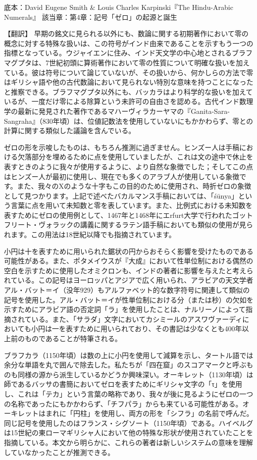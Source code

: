 \documentclass[a4paper,11pt,openany]{ltjsbook}
\begin{document}
底本：David Eugene Smith \& Louis Charles Karpinski『The Hindu-Arabic Numerals』
該当章：第4章：記号「ゼロ」の起源と誕生

【翻訳】
早期の銘文に見られる以外にも、数論に関する初期著作において零の概念に対する特殊な扱いは、この符号がインド由来であることを示すもう一つの指標となっている。ウジャイエンに住み、インド天文学の中心地とされるブラフマグプタは、7世紀初頭に算術著作において零の性質について明確な扱いを加えている。彼は符号について論じていないが、その扱いから、何かしらの方法で零はギリシャ語や他の古代数論において見られない特別な意味を持つことになったと推察できる。ブラフマグプタ以外にも、バッカラはより科学的な扱いを加えているが、一度だけ零による除算という未許可の自由さを認める。古代インド数理学の最新に発見された著作であるマハーヴィラカーヤマの『Ganita-Sara-Sangraha』（830年頃）は、位値記数法を使用していないにもかかわらず、零との計算に関する類似した議論を含んでいる。

ゼロの形を示唆したものは、もちろん推測に過ぎません。ヒンズー人は手稿における欠落部分を埋めるために点を使用していましたが、これは文の途中で休止を表すときのように我々が使用するように、より自然な象徴でした；そしてこの点はヒンズー人が最初に使用し、現在でも多くのアラブ人が使用している象徴です。また、我々のXのような十字もこの目的のために使用され、時折ゼロの象徴として見つかります。上記で述べたバカルマンス手稿においては、「śūnya」という言葉に点を用いて未知数と零を表しています。また、比例式における未知数を表すためにゼロの使用例として、1467年と1468年にエrfurt大学で行われたゴットフリート・ヴォラックの講義に関するラテン語手稿においても類似の使用が見られます。この用法は18世紀以降でも指摘されています。

小円は十を表すために用いられた鋸状の円からおそらく影響を受けたものである可能性がある。また、ポタメイウスが『大成』において性単位制における偶然の空白を示すために使用したオミクロンも、インドの著者に影響を与えたと考えられている。この記号はヨーロッパとアジアで広く用いられ、アラビアの天文学者アル・バット＝イ（没年929）もアルファベット的な数字符号に関連して類似の記号を使用した。アル・バット＝イが性単位制における分（または秒）の欠如を示すためにアラビア語の否定詞「ラ」を使用したことは、ナルリーノによって指摘されている。また、「サラダ」文字においてカシミールのアスワヴァーディにおいても小円は一を表すために用いられており、その書記は少なくとも400年以上前のものであることが特筆される。

ブラフカラ（1150年頃）は数の上に小円を使用して減算を示し、タートル語では余分な単語を丸で囲んで除去した。私たちが「四在窟」のスコアマークと呼ぶものも同様の源から派生しているかどうか興味深い。オーキレット（1130年頃）は師であるバッサの書簡においてゼロを表すためにギリシャ文字の「τ」を使用し、これは「テカ」という言葉の略称であり、我々が後に見るようにゼロの一つの名称であったにもかかわらず、「チフパラ」からも来ている可能性がある。オーキレットはまれに「円柱」を使用し、両方の形を「シフラ」の名前で呼んだ。同じ記号を使用したのはフランス・シグソート（1150年頃）である。ハイベルグは15世紀の東ローマギリシャ人において他の特殊な形状が使用されていたことを指摘している。本文から明らかに、これらの著者は新しいシステムの意味を理解していなかったことが推測できる。
\end{document}
